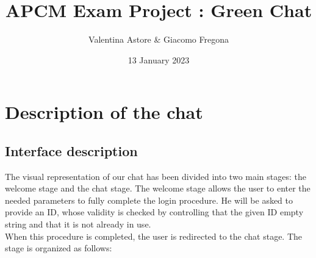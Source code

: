 \documentclass[12pt]{article}
\begin{document}
\title{APCM Exam Project : Green Chat}
\author{Valentina Astore & Giacomo Fregona}
\date{13 January 2023}

\maketitle

\section{Description of the chat}
\subsection*{Interface description}
The visual representation of our chat has been divided into two main stages: the welcome stage and the chat stage. The welcome stage allows the user to enter the needed parameters to fully complete the login procedure. He will be asked to provide an ID, whose validity is checked by controlling that the given ID empty string and that it is not already in use. \\ When this procedure is completed, the user is redirected to the chat stage. The stage is organized as follows:
\end{document}
